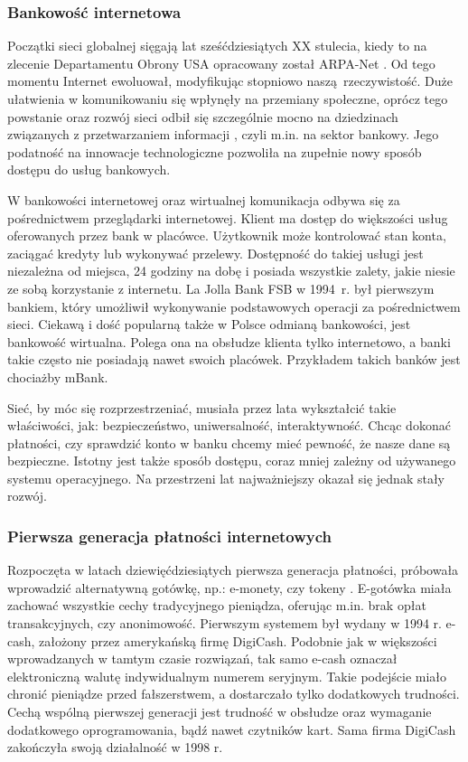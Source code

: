\subsubsection*{Bankowość internetowa}

Początki sieci globalnej sięgają lat sześćdziesiątych XX stulecia, kiedy to na zlecenie Departamentu Obrony USA opracowany został ARPA-Net \cite{pieniadz_elektroniczny-analiza}. Od tego momentu Internet ewoluował, modyfikując stopniowo naszą rzeczywistość. Duże ułatwienia w komunikowaniu się wpłynęły na przemiany społeczne, oprócz tego powstanie oraz rozwój sieci odbił się szczególnie mocno na dziedzinach związanych z przetwarzaniem informacji \cite{pieniadz_elektroniczny-analiza}, czyli m.in. na sektor bankowy. Jego podatność na innowacje technologiczne pozwoliła na zupełnie nowy sposób dostępu do usług bankowych.

W bankowości internetowej oraz wirtualnej komunikacja odbywa się za pośrednictwem przeglądarki internetowej. Klient ma dostęp do większości usług oferowanych przez bank w placówce. Użytkownik może kontrolować stan konta, zaciągać kredyty lub wykonywać przelewy. Dostępność do takiej usługi jest niezależna od miejsca, 24 godziny na dobę i posiada wszystkie zalety, jakie niesie ze sobą korzystanie z internetu. La Jolla Bank FSB w 1994~r. był pierwszym bankiem, który umożliwił wykonywanie podstawowych operacji za pośrednictwem sieci. Ciekawą i dość popularną także w Polsce odmianą bankowości, jest bankowość wirtualna. Polega ona na obsłudze klienta tylko internetowo, a banki takie często nie posiadają nawet swoich placówek. Przykładem takich banków jest chociażby mBank. 

Sieć, by móc się rozprzestrzeniać, musiała przez lata wykształcić takie właściwości, jak: bezpieczeństwo, uniwersalność, interaktywność. Chcąc dokonać płatności, czy sprawdzić konto w banku chcemy mieć pewność, że nasze dane są bezpieczne. Istotny jest także sposób dostępu, coraz mniej zależny od używanego systemu operacyjnego. Na przestrzeni lat najważniejszy okazał się jednak stały rozwój. 

\subsubsection*{Pierwsza generacja płatności internetowych}

Rozpoczęta w latach dziewięćdziesiątych pierwsza generacja płatności, próbowała wprowadzić alternatywną gotówkę, np.: e-monety, czy tokeny \cite{elektroniczne_metody_platnosci}. E-gotówka miała zachować wszystkie cechy tradycyjnego pieniądza, oferując m.in. brak opłat transakcyjnych, czy anonimowość. Pierwszym systemem był wydany w 1994 r. e-cash, założony przez amerykańską firmę DigiCash. Podobnie jak w większości wprowadzanych w tamtym czasie rozwiązań, tak samo e-cash oznaczał elektroniczną walutę indywidualnym numerem seryjnym. Takie podejście miało chronić pieniądze przed fałszerstwem, a dostarczało tylko dodatkowych trudności. Cechą wspólną pierwszej generacji jest trudność w obsłudze oraz wymaganie dodatkowego oprogramowania, bądź nawet czytników kart. Sama firma DigiCash zakończyła swoją działalność w 1998 r.

